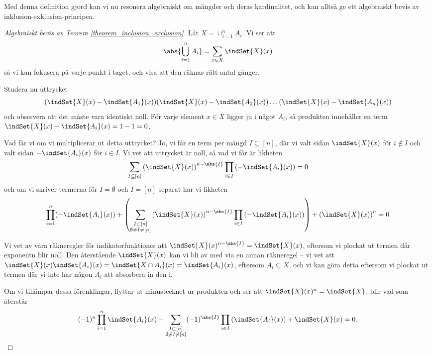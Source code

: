 \documentclass[nobib]{tufte-handout}
\begin{document}
Med denna definition gjord kan vi nu resonera algebraiskt om mängder och deras kardinalitet, och kan alltså ge ett algebraiskt bevis av inklusion-exklusion-principen.

\begin{proof}[Algebraiskt bevis av Teorem \ref{theorem_inclusion_exclusion}]
  Låt $X = \cup_{i=1}^n A_i$. Vi ser att
  $$\abs{\bigcup_{i=1}^n A_i} = \sum_{x \in X} \indSet{X}(x)$$
  så vi kan fokusera på varje punkt i taget, och visa att den räknas rätt antal gånger.

  Studera nu uttrycket
  $$(\indSet{X}(x) - \indSet{A_1}(x))(\indSet{X}(x) - \indSet{A_2}(x))\ldots(\indSet{X}(x) - \indSet{A_n}(x))$$
  och observera att det måste vara identiskt noll. För varje element $x\in X$ ligger ju i något $A_i$, så produkten innehåller en term $\indSet{X}(x) - \indSet{A_i}(x) = 1 - 1 = 0$.

  Vad får vi om vi multiplicerar ut detta uttrycket? Jo, vi får en term per mängd $I \subseteq [n]$, där vi valt sidan $\indSet{X}(x)$ för $i\not\in I$ och valt sidan $-\indSet{A_i}(x)$ för $i \in I$. Vi vet att uttrycket är noll, så vad vi får är likheten
  $$\sum_{I \subseteq [n]} \left(\indSet{X}(x)\right)^{n - \abs{I}}\prod_{i\in I}\left(-\indSet{A_i}(x)\right) = 0$$
  och om vi skriver termerna för $I = \emptyset$ och $I = [n]$ separat har vi likheten
  $$\prod_{i=1}^{n} (-\indSet{A_i}(x)) + \left(\sum_{\substack{I \subset [n]\\\emptyset \neq I \neq [n]}} \left(\indSet{X}(x)\right)^{n - \abs{I}}\prod_{i\in I}\left(-\indSet{A_i}(x)\right)\right) + \left(\indSet{X}(x)\right)^n = 0$$

  Vi vet av våra räkneregler för indikatorfunktioner att $\indSet{X}(x)^{n-\abs{I}} = \indSet{X}(x)$, eftersom vi plockat ut termen där exponentn blir noll. Den återstående $\indSet{X}(x)$ kan vi bli av med via en annan räkneregel -- vi vet att $\indSet{X}(x)\indSet{A_i}(x) = \indSet{X \cap A_i}(x) = \indSet{A_i}(x)$, eftersom $A_i \subseteq X$, och vi kan göra detta eftersom vi plockat ut termen där vi inte har någon $A_i$ att absorbera in den i. 
  
  Om vi tillämpar dessa förenklingar, flyttar ut minustecknet ur produkten och ser att $\indSet{X}(x)^n = \indSet{X}$, blir vad som återstår
  $$(-1)^n\prod_{i=1}^{n} \indSet{A_i}(x) + \sum_{\substack{I \subset [n]\\\emptyset \neq I \neq [n]}} (-1)^{\abs{I}}\prod_{i\in I}\left(\indSet{A_i}(x)\right) + \indSet{X}(x) = 0.$$
  

\end{proof}
\end{document}
